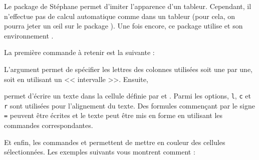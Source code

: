 Le package  de Stéphane  permet d'imiter l'apparence d'un tableur. Cependant, il n'effectue pas de calcul automatique comme dans un tableur (pour cela, on pourra jeter un {\oe}il sur le package ). Une fois encore, ce package utilise  et son environnement .

La première commande à retenir est la suivante :
\begin{center}
\end{center}

L'argument  permet de spécifier les lettres des colonnes utilisées soit une par une, soit en utilisant un << intervalle >>.
Ensuite, \begin{center}\end{center} permet d'écrire un texte dans la cellule définie par  et . Parmi les options, \verb!l!, \verb!c! et \verb!r! sont utilisées pour l'alignement du texte. Des formules commençant par le signe \verb!=! peuvent être écrites et le texte peut être mis en forme en utilisant les commandes correspondantes.

Et enfin, les commandes  et  permettent de mettre en couleur des cellules sélectionnées. Les exemples suivants vous montrent comment :\bigskip

{\NewFont
\begin{SideBySideExample}
    \bigskip

    \bigskip

\end{SideBySideExample}
}
